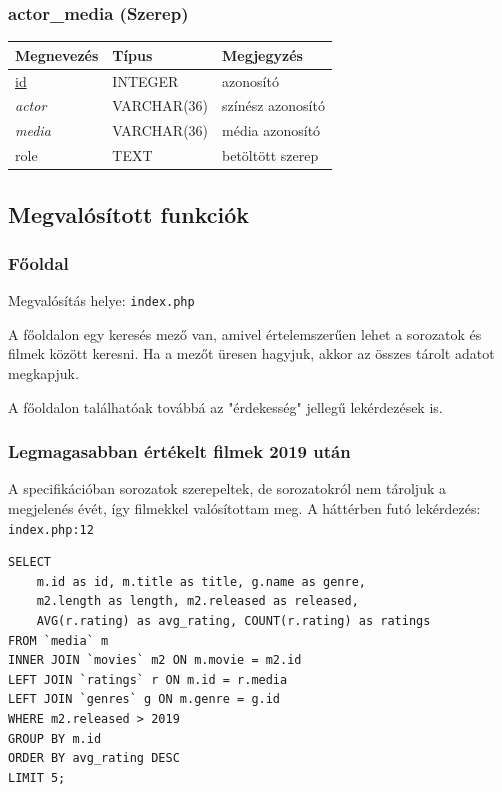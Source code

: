 \documentclass[12pt,a4paper,titlepage]{article}  %
\begin{document}
\subsubsection{actor\_media (Szerep)}
\begin{tabular}{|l|l|l|}
	\hline
	Megnevezés & Típus & Megjegyzés \\
	\hline
	\underline{id} & INTEGER & azonosító \\
	\hline
	\textit{actor} & VARCHAR(36) & színész azonosító \\
	\hline
	\textit{media} & VARCHAR(36) & média azonosító \\
	\hline
	role & TEXT & betöltött szerep \\
	\hline
\end{tabular}

\subsection{Megvalósított funkciók}

\subsubsection{Főoldal}

\noindent Megvalósítás helye: \texttt{index.php}

\bigskip

A főoldalon egy keresés mező van, amivel értelemszerűen lehet a sorozatok és filmek között keresni. Ha a mezőt üresen hagyjuk, akkor az összes tárolt adatot megkapjuk.

A főoldalon találhatóak továbbá az "érdekesség" jellegű lekérdezések is.

\subsubsection*{Legmagasabban értékelt filmek 2019 után}

A specifikációban sorozatok szerepeltek, de sorozatokról nem tároljuk a megjelenés évét, így filmekkel valósítottam meg. A háttérben futó lekérdezés:\\
\texttt{index.php:12}
\begin{verbatim}
SELECT 
	m.id as id, m.title as title, g.name as genre, 
	m2.length as length, m2.released as released, 
	AVG(r.rating) as avg_rating, COUNT(r.rating) as ratings 
FROM `media` m
INNER JOIN `movies` m2 ON m.movie = m2.id
LEFT JOIN `ratings` r ON m.id = r.media
LEFT JOIN `genres` g ON m.genre = g.id
WHERE m2.released > 2019
GROUP BY m.id
ORDER BY avg_rating DESC
LIMIT 5;
\end{verbatim}
\end{document}
